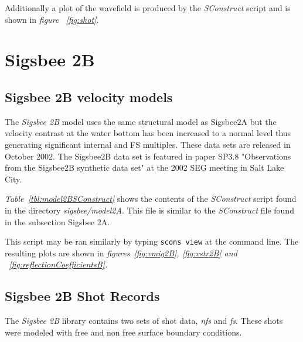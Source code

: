{
\tiny

\normalsize
}
Additionally a plot of the wavefield is produced by the \emph{SConstruct} script and is shown in \emph{figure ~\ref{fig:shot}.}

\section{Sigsbee 2B}
\subsection{Sigsbee 2B velocity models}
The \emph{Sigsbee 2B} model uses the same structural model as Sigsbee2A but the velocity contrast at the water bottom has been increased to a normal level thus generating significant internal and FS multiples. These data sets are released in October 2002. The Sigsbee2B data set is featured in paper SP3.8 "Observations from the Sigsbee2B synthetic data set" at the 2002 SEG meeting in Salt Lake City.  

\emph{Table~\ref{tbl:model2BSConstruct}} shows the contents of the \emph{SConstruct} script found in the directory \emph{sigsbee/model2A}.  This file is similar to the \emph{SConstruct} file found in the subsection Sigsbee 2A. 

{
\tiny

\normalsize
}
This script may be ran similarly by typing \texttt{scons view} at the command line.  The resulting plots are shown in \emph{figures~\ref{fig:vmig2B}, \ref{fig:vstr2B} and ~\ref{fig:reflectionCoefficientsB}.}

\subsection{Sigsbee 2B Shot Records}
The \emph{Sigsbee 2B} library contains two sets of shot data, \emph{nfs} and \emph{fs}.  These shots were modeled with free and non free surface boundary conditions.  

